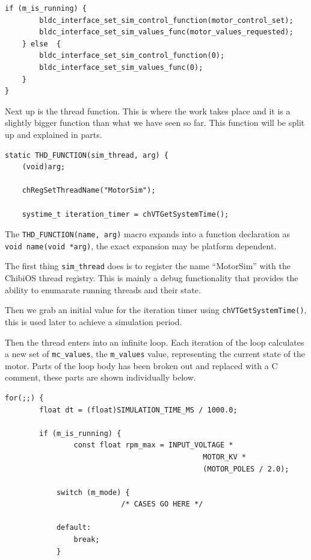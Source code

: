 \documentclass[12pt]{article} %
\begin{document}
{\begin{Verbatim}[samepage=true,frame=single,label=Embedded/RC\_Controller/motor\_sim.c]
	if (m_is_running) {
		bldc_interface_set_sim_control_function(motor_control_set);
		bldc_interface_set_sim_values_func(motor_values_requested);
	} else  {
		bldc_interface_set_sim_control_function(0);
		bldc_interface_set_sim_values_func(0);
	}
}
\end{Verbatim}

Next up is the thread function. This is where the work takes place and
it is a slightly bigger function than what we have seen so far. This
function will be split up and explained in parts.

\begin{Verbatim}[samepage=false,frame=single,label=Embedded/RC\_Controller/motor\_sim.c]
static THD_FUNCTION(sim_thread, arg) {
	(void)arg;

	chRegSetThreadName("MotorSim");

	systime_t iteration_timer = chVTGetSystemTime();
\end{Verbatim}

The \verb!THD_FUNCTION(name, arg)! macro expands into a function
declaration as \verb!void name(void *arg)!, the exact expansion may be
platform dependent.

The first thing \verb!sim_thread! does is to register the name
``MotorSim'' with the ChibiOS thread registry. This is mainly a debug
functionality that provides the ability to enumarate running threads
and their state.

Then we grab an initial value for the iteration timer using
\verb!chVTGetSystemTime()!, this is used later to achieve a simulation
period.

Then the thread enters into an infinite loop. Each iteration of the
loop calculates a new set of \verb!mc_values!, the \verb!m_values!
  value, representing the current state of the motor. Parts of the
  loop body has been broken out and replaced with a C comment, these
  parts are shown individually below.

\begin{Verbatim}[samepage=false,frame=single,label=Embedded/RC\_Controller/motor\_sim.c]        
	for(;;) {
		float dt = (float)SIMULATION_TIME_MS / 1000.0;

		if (m_is_running) {
		        const float rpm_max = INPUT_VOLTAGE *
                                              MOTOR_KV *
                                              (MOTOR_POLES / 2.0);

			switch (m_mode) {
                           /* CASES GO HERE */ 

			default:
				break;
			}


\end{Verbatim}}
\end{document}
